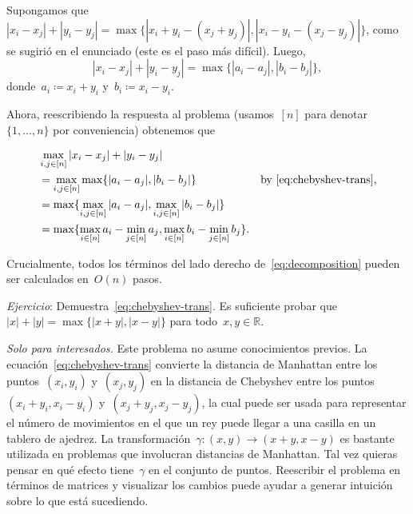 
Supongamos
que~$|x_i - x_j| + |y_i - y_j| = \max \{|x_i + y_i - (x_j + y_j)|, |x_i - y_i - (x_j -
y_j)| \}$, como se sugirió en el enunciado (este es el paso más difícil). Luego,
\begin{equation}
  \label{eq:chebyshev-trans}
  |x_i - x_j| + |y_i - y_j| = \max \{|a_i - a_j|, |b_i - b_j| \},
\end{equation}
donde~$a_i \coloneqq x_i + y_i$ y~$b_i \coloneqq x_i - y_i$.

Ahora, reescribiendo la respuesta al problema (usamos~$[n]$ para
denotar~$\{1, \dots, n\}$ por conveniencia) obtenemos que

\begin{align}
  \label{eq:decomposition}
  &\max_{i, j \in [n]} |x_i - x_j| + |y_i - y_j| \nonumber \\
  &= \max_{i, j \in [n]} \max \{|a_i - a_j|, |b_i - b_j| \} & \text{by~\ref{eq:chebyshev-trans},} \nonumber \\
  &= \max \{ \max_{i, j \in [n]} |a_i - a_j|, \max_{i, j \in [n]} |b_i - b_j| \} \nonumber \\
  &= \max \{ \max_{i \in [n]} a_i - \min_{j \in [n]} a_j, \max_{i \in [n]} b_i - \min_{j \in [n]} b_j \}.
\end{align}

Crucialmente, todos los términos del lado derecho de~\ref{eq:decomposition} pueden ser calculados
en~$O(n)$ pasos.

\textit{Ejercicio}: Demuestra~\ref{eq:chebyshev-trans}. Es suficiente probar
que~$|x| + |y| = \max \{|x + y|, |x - y|\}$ para todo~$x, y \in \mathbb{R}$.

\textit{Solo para interesados.} Este problema no asume conocimientos previos. La ecuación~\ref{eq:chebyshev-trans}
convierte la distancia de Manhattan entre los puntos~$(x_i, y_i)$ y~$(x_j, y_j)$ en
la distancia de Chebyshev entre los puntos~$(x_i + y_i, x_i - y_i)$
y~$(x_j + y_j, x_j - y_j)$, la cual puede ser usada para representar el número de
movimientos en el que un rey puede llegar a una casilla en un tablero de ajedrez. La
transformación~$\gamma: (x, y) \rightarrow (x + y, x - y)$ es bastante utilizada en problemas que
involucran distancias de Manhattan. Tal vez quieras pensar en qué efecto
tiene~$\gamma$ en el conjunto de puntos. Reescribir el problema en términos de
matrices y visualizar los cambios puede ayudar a generar intuición sobre lo que está
sucediendo.

